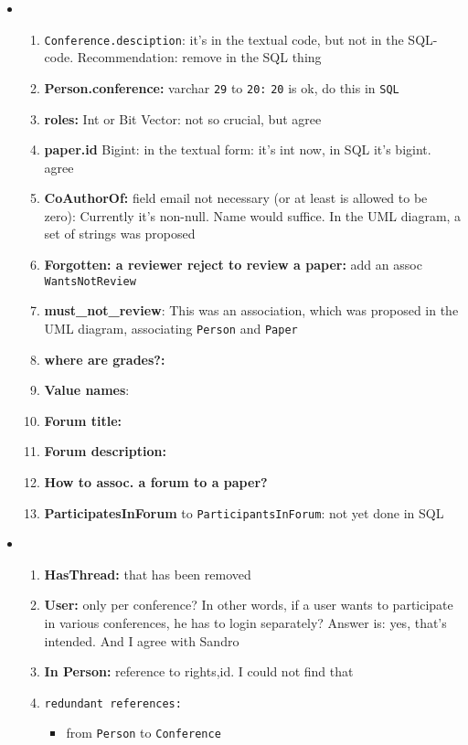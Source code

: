 \begin{itemize}
\item 
  \begin{enumerate}
  \item \texttt{Conference.desciption}: it's in the textual code, but not in
    the SQL-code. Recommendation: remove in the SQL thing
  \item \textbf{Person.conference:} varchar \texttt{29} to \texttt{20:}
    \texttt{20} is ok, do this in \texttt{SQL}
  \item \textbf{roles:} Int or Bit Vector: not so crucial, but agree
  \item \textbf{paper.id} Bigint: in the textual form: it's int now, in SQL it's
    bigint. agree
  \item \textbf{CoAuthorOf:} field email not necessary (or at least is allowed
    to be zero): Currently it's non-null. Name would suffice. In the UML
    diagram, a set of strings was proposed
  \item \textbf{Forgotten: a reviewer reject to review a paper:} add an assoc
    \texttt{WantsNotReview}
  \item \textbf{must\_not\_review}: This was an association, which was proposed
    in the UML diagram, associating \texttt{Person} and \texttt{Paper}
  \item \textbf{where are grades?:} 
  \item \textbf{Value names}:
  \item \textbf{Forum title:}
  \item \textbf{Forum description:}
  \item \textbf{How to assoc. a forum to a paper?}
  \item \textbf{ParticipatesInForum} to \texttt{ParticipantsInForum}: not yet
    done in SQL
  \end{enumerate}
\item 
  \begin{enumerate}
  \item \textbf{HasThread:} that has been removed
  \item \textbf{User:} only per conference? In other words, if a user wants to
  participate in various conferences, he has to login separately? Answer is:
  yes, that's intended. And I agree with Sandro
\item \textbf{In Person:} reference to rights,id. I could not find that
\item \texttt{redundant references:}
  \begin{itemize}
  \item  from \texttt{Person} to  \texttt{Conference} 

\end{itemize}
\end{enumerate}
\end{itemize}
